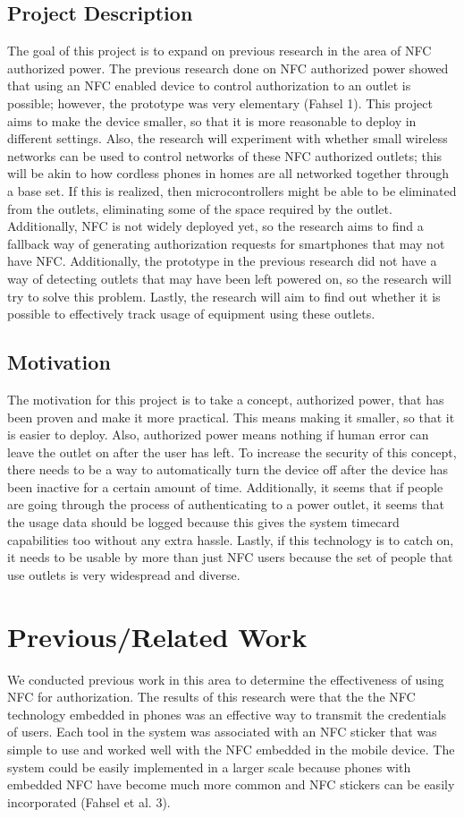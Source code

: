\documentclass{sigchi}
\begin{document}
\subsection {Project Description}
The goal of this project is to expand on previous research in the area of NFC authorized power. The previous research done on NFC authorized power showed that using an NFC enabled device to control authorization to an outlet is possible; however, the prototype was very elementary (Fahsel 1). This project aims to make the device smaller, so that it is more reasonable to deploy in different settings. Also, the research will experiment with whether small wireless networks can be used to control networks of these NFC authorized outlets; this will be akin to how cordless phones in homes are all networked together through a base set. If this is realized, then microcontrollers might be able to be eliminated from the outlets, eliminating some of the space required by the outlet.  Additionally, NFC is not widely deployed yet, so the research aims to find a fallback way of generating authorization requests for smartphones that may not have NFC. Additionally, the prototype in the previous research did not have a way of detecting outlets that may have been left powered on, so the research will try to solve this problem. Lastly, the research will aim to find out whether it is possible to effectively track usage of equipment using these outlets. 

\subsection {Motivation}
The motivation for this project is to take a concept, authorized power, that has been proven and make it more practical.  This means making it smaller, so that it is easier to deploy. Also, authorized power means nothing if human error can leave the outlet on after the user has left. To increase the security of this concept, there needs to be a way to automatically turn the device off after the device has been inactive for a certain amount of time. Additionally, it seems that if people are going through the process of authenticating to a power outlet, it seems that the usage data should be logged because this gives the system timecard capabilities too without any extra hassle. Lastly, if this technology is to catch on, it needs to be usable by more than just NFC users because the set of people that use outlets is very widespread and diverse.

\section{Previous/Related Work}
We conducted previous work in this area to determine the effectiveness of using NFC for authorization. The results of this research were that the the NFC technology embedded in phones was an effective way to transmit the credentials of users. Each tool in the system was associated with an NFC sticker that was simple to use and worked well with the NFC embedded in the mobile device. The system could be easily implemented in a larger scale because phones with embedded NFC have become much more common and NFC stickers can be easily incorporated (Fahsel et al. 3).
\end{document}
